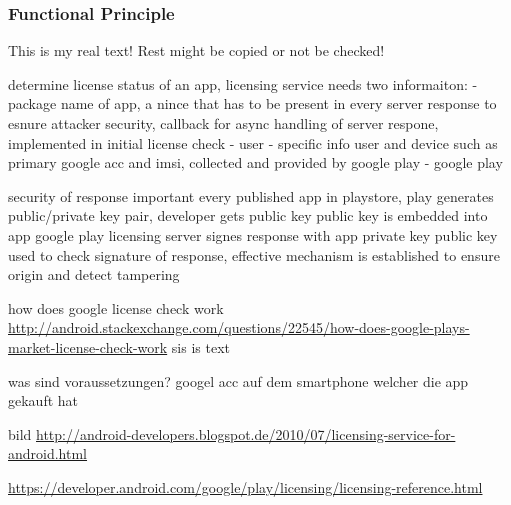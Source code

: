 \subsubsection{Functional Principle} \label{subsection:license-google-functional}
This is my real text! Rest might be copied or not be checked!

%
determine license status of an app, licensing service needs two informaiton:
- package name of app, a nince that has to be present in every server response to esnure attacker security, callback for async handling of server respone, implemented in initial license check - user
- specific info user and device such as primary google acc and imsi, collected and provided by google play - google play

security of response important
every published app in playstore, play generates public/private key pair, developer gets public key
public key is embedded into app
google play licensing server signes response with app private key
public key used to check signature of response, effective mechanism is established to ensure origin and detect tampering
\cite{munteanLicense}
%


how does google license check work \url{http://android.stackexchange.com/questions/22545/how-does-google-plays-market-license-check-work}\newline
sis is text

was sind voraussetzungen? googel acc auf dem smartphone welcher die app gekauft hat\newline

bild \url{http://android-developers.blogspot.de/2010/07/licensing-service-for-android.html}

\url{https://developer.android.com/google/play/licensing/licensing-reference.html}
